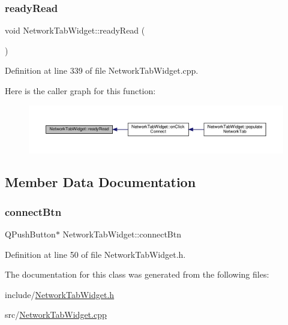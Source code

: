 \subsubsection{\texorpdfstring{ready\+Read}{readyRead}}
{\footnotesize\ttfamily void Network\+Tab\+Widget\+::ready\+Read (\begin{DoxyParamCaption}{ }\end{DoxyParamCaption})\hspace{0.3cm}{\ttfamily [slot]}}



Definition at line 339 of file Network\+Tab\+Widget.\+cpp.

Here is the caller graph for this function\+:
\nopagebreak
\begin{figure}[H]
\begin{center}
\leavevmode
\includegraphics[width=350pt]{class_network_tab_widget_ab1ce7580ab72e739357b7621788dd354_icgraph}
\end{center}
\end{figure}


\subsection{Member Data Documentation}
\mbox{\label{class_network_tab_widget_a55d24d14f272f78301d0f16a362b7fd4}} 
\subsubsection{\texorpdfstring{connect\+Btn}{connectBtn}}
{\footnotesize\ttfamily Q\+Push\+Button$\ast$ Network\+Tab\+Widget\+::connect\+Btn}



Definition at line 50 of file Network\+Tab\+Widget.\+h.



The documentation for this class was generated from the following files\+:\begin{DoxyCompactItemize}
\item 
include/\hyperlink{_network_tab_widget_8h}{Network\+Tab\+Widget.\+h}\item 
src/\hyperlink{_network_tab_widget_8cpp}{Network\+Tab\+Widget.\+cpp}\end{DoxyCompactItemize}

